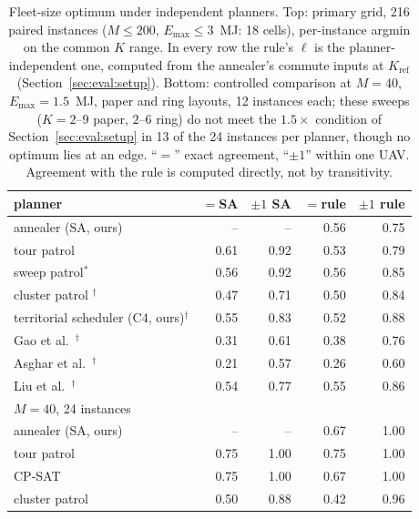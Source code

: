 \documentclass[journal,outdir=./]{IEEEtran}
\newcommand{\Emax}{E_{\max}}
\begin{document}
\begin{table}[t]\centering
\footnotesize\setlength{\tabcolsep}{3pt}
\caption{Fleet-size optimum under independent planners. Top: primary grid, 216 paired instances ($M\le200$, $\Emax\le3$~MJ: 18 cells), per-instance argmin on the common $K$ range. In every row the rule's $\ell$ is the planner-independent one, computed from the annealer's commute inputs at $K_{\mathrm{ref}}$ (Section~\ref{sec:eval:setup}). Bottom: controlled comparison at $M=40$, $\Emax=1.5$~MJ, paper and ring layouts, 12 instances each; these sweeps ($K=2$--$9$ paper, $2$--$6$ ring) do not meet the $1.5\times$ condition of Section~\ref{sec:eval:setup} in 13 of the 24 instances per planner, though no optimum lies at an edge. ``$=$'' exact agreement, ``$\pm1$'' within one UAV. Agreement with the rule is computed directly, not by transitivity.}
\label{tab:baseline}
\begin{tabular}{lrrrr}
\toprule
planner & $=$SA & $\pm1$ SA & $=$rule & $\pm1$ rule\\
\midrule
annealer (SA, ours) & -- & -- & 0.56 & 0.75\\
tour patrol & 0.61 & 0.92 & 0.53 & 0.79\\
sweep patrol$^{\ast}$ & 0.56 & 0.92 & 0.56 & 0.85\\
cluster patrol \cite{rahimi2024graph}$^{\dagger}$ & 0.47 & 0.71 & 0.50 & 0.84\\
territorial scheduler (C4, ours)$^{\dagger}$ & 0.55 & 0.83 & 0.52 & 0.88\\
Gao et al.\ \cite{gao2023aoi}$^{\dagger}$ & 0.31 & 0.61 & 0.38 & 0.76\\
Asghar et al.\ \cite{asghar2025persistent}$^{\dagger}$ & 0.21 & 0.57 & 0.26 & 0.60\\
Liu et al.\ \cite{liu2022aoi}$^{\dagger}$ & 0.54 & 0.77 & 0.55 & 0.86\\
\midrule
\multicolumn{5}{l}{$M=40$, 24 instances}\\
annealer (SA, ours) & -- & -- & 0.67 & 1.00\\
tour patrol & 0.75 & 1.00 & 0.75 & 1.00\\
CP-SAT & 0.75 & 1.00 & 0.67 & 1.00\\
cluster patrol & 0.50 & 0.88 & 0.42 & 0.96\\
\bottomrule
\end{tabular}
\par{}
\end{table}
\end{document}
